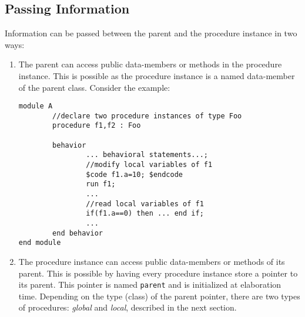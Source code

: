 	\subsection{Passing Information}
	Information can be passed between the parent and the procedure instance
	in two ways:
	\begin{enumerate}
	\item The parent can access public data-members or methods 
	in the procedure instance.  This is possible as the procedure instance is a named
	data-member of the parent class.  Consider the example:
	\begin{verbatim}
module A
        //declare two procedure instances of type Foo
        procedure f1,f2 : Foo

        behavior 
                ... behavioral statements...;
                //modify local variables of f1
                $code f1.a=10; $endcode
                run f1;
                ...
                //read local variables of f1
                if(f1.a==0) then ... end if;
                ...
        end behavior
end module
\end{verbatim}
	\item The procedure instance can access public data-members or methods of
	its parent. This is possible by having every procedure instance store a 
	pointer to its parent. This pointer is named \texttt{parent} and is initialized
	at elaboration time. Depending on the type (class) of the parent pointer, there
	are two types of procedures: \emph{global} and \emph{local}, described in the next
	section.
	\end{enumerate}

